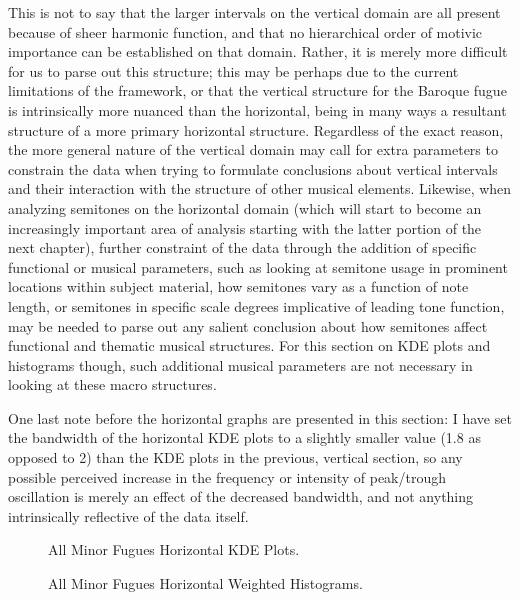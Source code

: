 This is not to say that the larger intervals on the vertical domain are
all present because of sheer harmonic function, and that no hierarchical
order of motivic importance can be established on that domain. Rather,
it is merely more difficult for us to parse out this structure; this may
be perhaps due to the current limitations of the framework, or that the
vertical structure for the Baroque fugue is intrinsically more nuanced
than the horizontal, being in many ways a resultant structure of a more
primary horizontal structure. Regardless of the exact reason, the more
general nature of the vertical domain may call for extra parameters to
constrain the data when trying to formulate conclusions about vertical
intervals and their interaction with the structure of other musical
elements. Likewise, when analyzing semitones on the horizontal domain
(which will start to become an increasingly important area of analysis
starting with the latter portion of the next chapter), further
constraint of the data through the addition of specific functional or
musical parameters, such as looking at semitone usage in prominent
locations within subject material, how semitones vary as a function of
note length, or semitones in specific scale degrees implicative of
leading tone function, may be needed to parse out any salient conclusion
about how semitones affect functional and thematic musical structures.
For this section on KDE plots and histograms though, such additional
musical parameters are not necessary in looking at these macro
structures.

One last note before the horizontal graphs are presented in this
section: I have set the bandwidth of the horizontal KDE plots to a
slightly smaller value (1.8 as opposed to 2) than the KDE plots in the
previous, vertical section, so any possible perceived increase in the
frequency or intensity of peak/trough oscillation is merely an effect of
the decreased bandwidth, and not anything intrinsically reflective of
the data itself.




\begin{figure}[H]
    \begin{center}
    \caption{All Minor Fugues Horizontal KDE Plots.}
    \end{center}
\end{figure}
    



\begin{figure}[H]
    \begin{center}
    \caption{All Minor Fugues Horizontal Weighted Histograms.}
    \end{center}
\end{figure}
    



